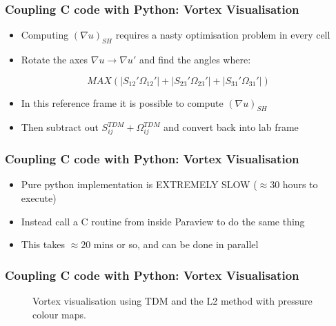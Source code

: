 \documentclass[landscape,10pt]{beamer}
\newcommand{\svginput}[1]{}
\begin{document}
\begin{frame}[fragile]
\frametitle{Coupling C code with Python: Vortex Visualisation}
\begin{itemize}
\item Computing $\left(\nabla u\right)_{SH}$ requires a nasty optimisation problem in every cell
\item Rotate the axes $\nabla u \rightarrow \nabla u'$ and find the angles where:
\end{itemize}
\begin{equation}
MAX(|S_{12}'\Omega_{12}'| + |S_{23}'\Omega_{23}'| + |S_{31}'\Omega_{31}'|)
\end{equation}

\begin{itemize}
\item In this reference frame it is possible to compute $(\nabla u)_{SH}$
\item Then subtract out $S_{ij}^{TDM} + \Omega_{ij}^{TDM}$ and convert back into lab frame
\end{itemize}

\end{frame}

\begin{frame}[fragile]
\frametitle{Coupling C code with Python: Vortex Visualisation}
\begin{itemize}
\item Pure python implementation is EXTREMELY SLOW ($\approx 30$ hours to execute)
\item Instead call a C routine from inside Paraview to do the same thing 
\item This takes $\approx 20$ mins or so, and can be done in parallel
\end{itemize}

\end{frame}

\begin{frame}[fragile]
\frametitle{Coupling C code with Python: Vortex Visualisation}
\begin{figure}[h]
    \scriptsize
    \centering
    \def\svgwidth{0.99\columnwidth}
    \svginput{vort_flipped.pdf_tex}
    \caption{Vortex visualisation using TDM and the L2 method with pressure colour maps.}
    \label{vort_flipped}
\end{figure}

\end{frame}
\end{document}
